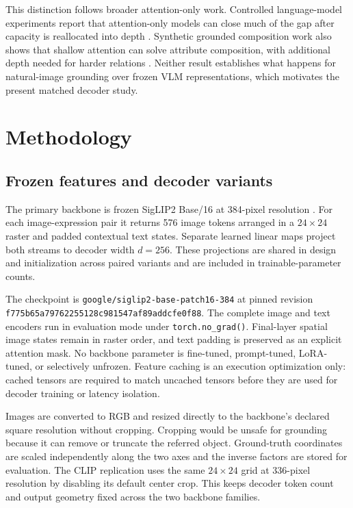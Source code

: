 \documentclass[10pt]{article}
\begin{document}
This distinction follows broader attention-only work. Controlled language-model
experiments report that attention-only models can close much of the gap after
capacity is reallocated into depth \citep{ndubuaku2026attention}. Synthetic
grounded composition work also shows that shallow attention can solve attribute
composition, with additional depth needed for harder relations
\citep{sikarwar2022groundcompose}. Neither result establishes what happens for
natural-image grounding over frozen VLM representations, which motivates the
present matched decoder study.

\section{Methodology}\label{methodology}

\subsection{Frozen features and decoder variants}\label{frozen-features-and-decoder-variants}

The primary backbone is frozen SigLIP2 Base/16 at 384-pixel resolution
\citep{tschannen2025siglip2}. For each image-expression pair it returns 576
image tokens arranged in a $24\times24$ raster and padded contextual text
states. Separate learned linear maps project both streams to decoder width
$d=256$. These projections are shared in design and initialization across
paired variants and are included in trainable-parameter counts.

The checkpoint is \texttt{google/siglip2-base-patch16-384} at pinned revision
\nolinkurl{f775b65a79762255128c981547af89addcfe0f88}. The complete image and text
encoders run in evaluation mode under \texttt{torch.no\_grad()}. Final-layer
spatial image states remain in raster order, and text padding is preserved as
an explicit attention mask. No backbone parameter is fine-tuned, prompt-tuned,
LoRA-tuned, or selectively unfrozen. Feature caching is an execution
optimization only: cached tensors are required to match uncached tensors before
they are used for decoder training or latency isolation.

Images are converted to RGB and resized directly to the backbone's declared
square resolution without cropping. Cropping would be unsafe for grounding
because it can remove or truncate the referred object. Ground-truth coordinates
are scaled independently along the two axes and the inverse factors are stored
for evaluation. The CLIP replication uses the same $24\times24$ grid at
336-pixel resolution by disabling its default center crop. This keeps decoder
token count and output geometry fixed across the two backbone families.
\end{document}
